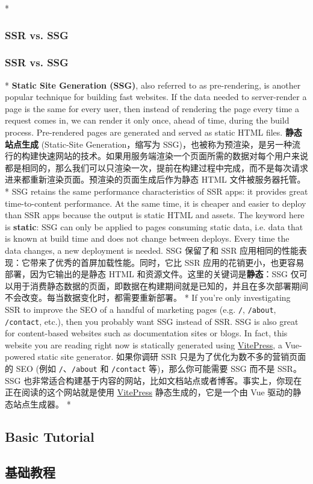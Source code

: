 \begin{paracol}{2} 
\switchcolumn[0]*%
\subsubsection{SSR vs. SSG}
\switchcolumn
\subsubsection{SSR vs. SSG}
\switchcolumn[0]*%
\textbf{Static Site Generation (SSG)}, also referred to as
pre-rendering, is another popular technique for building fast websites.
If the data needed to server-render a page is the same for every user,
then instead of rendering the page every time a request comes in, we can
render it only once, ahead of time, during the build process.
Pre-rendered pages are generated and served as static HTML files.
\switchcolumn
\textbf{静态站点生成} (Static-Site Generation，缩写为
SSG)，也被称为预渲染，是另一种流行的构建快速网站的技术。如果用服务端渲染一个页面所需的数据对每个用户来说都是相同的，那么我们可以只渲染一次，提前在构建过程中完成，而不是每次请求进来都重新渲染页面。预渲染的页面生成后作为静态
HTML 文件被服务器托管。
\switchcolumn[0]*%
SSG retains the same performance characteristics of SSR apps: it
provides great time-to-content performance. At the same time, it is
cheaper and easier to deploy than SSR apps because the output is static
HTML and assets. The keyword here is \textbf{static}: SSG can only be
applied to pages consuming static data, i.e. data that is known at build
time and does not change between deploys. Every time the data changes, a
new deployment is needed.
\switchcolumn
SSG 保留了和 SSR
应用相同的性能表现：它带来了优秀的首屏加载性能。同时，它比 SSR
应用的花销更小，也更容易部署，因为它输出的是静态 HTML
和资源文件。这里的关键词是\textbf{静态}：SSG
仅可以用于消费静态数据的页面，即数据在构建期间就是已知的，并且在多次部署期间不会改变。每当数据变化时，都需要重新部署。
\switchcolumn[0]*%
If you're only investigating SSR to improve the SEO of a handful of
marketing pages (e.g. \texttt{/}, \texttt{/about}, \texttt{/contact},
etc.), then you probably want SSG instead of SSR. SSG is also great for
content-based websites such as documentation sites or blogs. In fact,
this website you are reading right now is statically generated using
\href{https://vitepress.dev/}{VitePress}, a Vue-powered static site
generator.
\switchcolumn
如果你调研 SSR 只是为了优化为数不多的营销页面的 SEO (例如
\texttt{/}、\texttt{/about} 和 \texttt{/contact} 等)，那么你可能需要 SSG
而不是 SSR。SSG
也非常适合构建基于内容的网站，比如文档站点或者博客。事实上，你现在正在阅读的这个网站就是使用
\href{https://vitepress.dev/}{VitePress} 静态生成的，它是一个由 Vue
驱动的静态站点生成器。
\switchcolumn[0]*%
\subsection{Basic Tutorial}
\switchcolumn
\subsection{基础教程}
\end{paracol}


